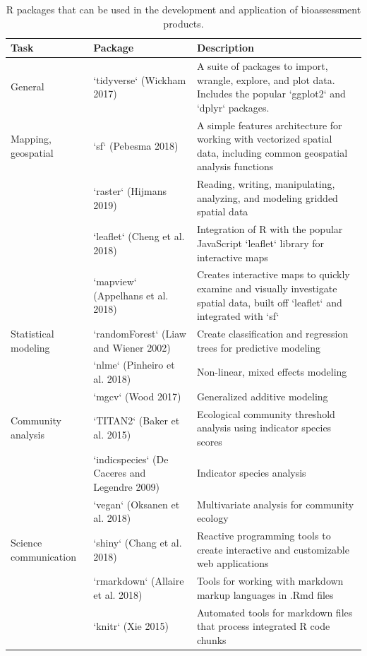 \documentclass[fleqn,10pt,lineno]{wlpeerj} %
\begin{document}
\begin{table}

\caption{\label{tab:rpkgtab}R packages that can be used in the development and application of bioassessment products.}
\centering
\begin{tabular}[t]{lll}
\toprule
Task & Package & Description\\
\midrule
General & `tidyverse` (Wickham 2017) & A suite of packages to import, wrangle, explore, and plot data.  Includes the popular `ggplot2` and `dplyr` packages.\\
Mapping, geospatial & `sf` (Pebesma 2018) & A simple features architecture for working with vectorized spatial data, including common geospatial analysis functions\\
 & `raster` (Hijmans 2019) & Reading, writing, manipulating, analyzing, and modeling gridded spatial data\\
 & `leaflet` (Cheng et al. 2018) & Integration of R with the popular JavaScript `leaflet` library for interactive maps\\
 & `mapview` (Appelhans et al. 2018) & Creates interactive maps to quickly examine and visually investigate spatial data, built off `leaflet` and integrated with `sf`\\
\addlinespace
Statistical modeling & `randomForest` (Liaw and Wiener 2002) & Create classification and regression trees for predictive modeling\\
 & `nlme` (Pinheiro et al. 2018) & Non-linear, mixed effects modeling\\
 & `mgcv` (Wood 2017) & Generalized additive modeling\\
Community analysis & `TITAN2` (Baker et al. 2015) & Ecological community threshold analysis using indicator species scores\\
 & `indicspecies` (De Caceres and Legendre 2009) & Indicator species analysis\\
\addlinespace
 & `vegan` (Oksanen et al. 2018) & Multivariate analysis for community ecology\\
Science communication & `shiny` (Chang et al. 2018) & Reactive programming tools to create interactive and customizable web applications\\
 & `rmarkdown` (Allaire et al. 2018) & Tools for working with markdown markup languages in .Rmd files\\
 & `knitr` (Xie 2015) & Automated tools for markdown files that process integrated R code chunks\\
\bottomrule
\end{tabular}
\end{table}
\end{document}
